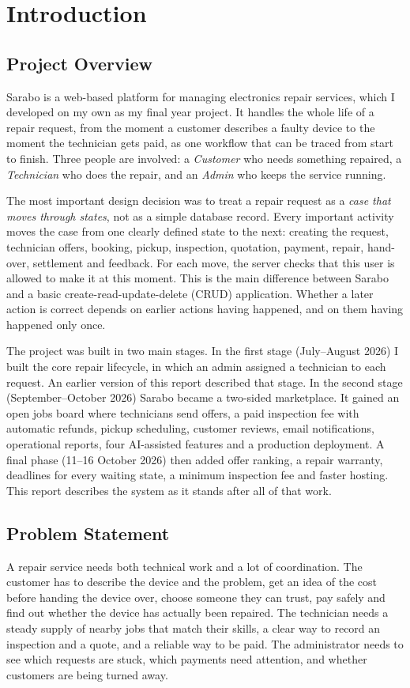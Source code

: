 \documentclass{standalone}
\begin{document}
\chapter{Introduction}

\section{Project Overview}
Sarabo is a web-based platform for managing electronics repair services, which I developed on my own as my final year project. It handles the whole life of a repair request, from the moment a customer describes a faulty device to the moment the technician gets paid, as one workflow that can be traced from start to finish. Three people are involved: a \emph{Customer} who needs something repaired, a \emph{Technician} who does the repair, and an \emph{Admin} who keeps the service running.

The most important design decision was to treat a repair request as a \emph{case that moves through states}, not as a simple database record. Every important activity moves the case from one clearly defined state to the next: creating the request, technician offers, booking, pickup, inspection, quotation, payment, repair, hand-over, settlement and feedback. For each move, the server checks that this user is allowed to make it at this moment. This is the main difference between Sarabo and a basic create-read-update-delete (CRUD) application. Whether a later action is correct depends on earlier actions having happened, and on them having happened only once.

The project was built in two main stages. In the first stage (July--August 2026) I built the core repair lifecycle, in which an admin assigned a technician to each request. An earlier version of this report described that stage. In the second stage (September--October 2026) Sarabo became a two-sided marketplace. It gained an open jobs board where technicians send offers, a paid inspection fee with automatic refunds, pickup scheduling, customer reviews, email notifications, operational reports, four AI-assisted features and a production deployment. A final phase (11--16 October 2026) then added offer ranking, a repair warranty, deadlines for every waiting state, a minimum inspection fee and faster hosting. This report describes the system as it stands after all of that work.

\section{Problem Statement}
A repair service needs both technical work and a lot of coordination. The customer has to describe the device and the problem, get an idea of the cost before handing the device over, choose someone they can trust, pay safely and find out whether the device has actually been repaired. The technician needs a steady supply of nearby jobs that match their skills, a clear way to record an inspection and a quote, and a reliable way to be paid. The administrator needs to see which requests are stuck, which payments need attention, and whether customers are being turned away.
\end{document}
